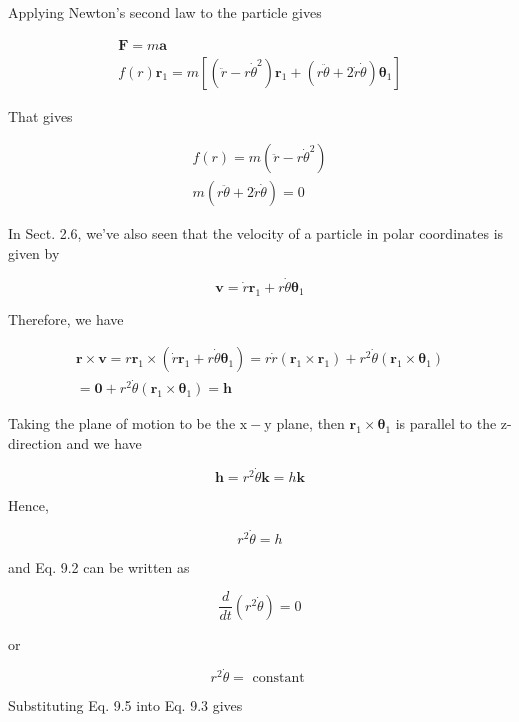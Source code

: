 \documentclass[10pt]{article}
\begin{document}
Applying Newton's second law to the particle gives

$$
\begin{gathered}
\mathbf{F}=m \mathbf{a} \\
f(r) \mathbf{r}_{1}=m\left[\left(\ddot{r}-r \dot{\theta}^{2}\right) \mathbf{r}_{1}+(r \ddot{\theta}+2 \dot{r} \dot{\theta}) \boldsymbol{\theta}_{1}\right]
\end{gathered}
$$

That gives


\begin{gather*}
f(r)=m\left(\ddot{r}-r \dot{\theta}^{2}\right)  \tag{9.3}\\
m(r \ddot{\theta}+2 \dot{r} \dot{\theta})=0 \tag{9.4}
\end{gather*}


In Sect. 2.6, we've also seen that the velocity of a particle in polar coordinates is given by

$$
\mathbf{v}=\dot{r} \mathbf{r}_{1}+r \dot{\theta} \boldsymbol{\theta}_{1}
$$

Therefore, we have

$$
\begin{gathered}
\mathbf{r} \times \mathbf{v}=r \mathbf{r}_{1} \times\left(\dot{r} \mathbf{r}_{1}+r \dot{\theta} \boldsymbol{\theta}_{1}\right)=r \dot{r}\left(\mathbf{r}_{1} \times \mathbf{r}_{1}\right)+r^{2} \dot{\theta}\left(\mathbf{r}_{1} \times \boldsymbol{\theta}_{1}\right) \\
=\mathbf{0}+r^{2} \dot{\theta}\left(\mathbf{r}_{1} \times \boldsymbol{\theta}_{1}\right)=\mathbf{h}
\end{gathered}
$$

Taking the plane of motion to be the $\mathrm{x}-\mathrm{y}$ plane, then $\mathbf{r}_{1} \times \boldsymbol{\theta}_{1}$ is parallel to the z-direction and we have

$$
\mathbf{h}=r^{2} \dot{\theta} \mathbf{k}=h \mathbf{k}
$$

Hence,


\begin{equation*}
r^{2} \dot{\theta}=h \tag{9.5}
\end{equation*}


and Eq. 9.2 can be written as

$$
\frac{d}{d t}\left(r^{2} \dot{\theta}\right)=0
$$

or

$$
r^{2} \dot{\theta}=\text { constant }
$$

Substituting Eq. 9.5 into Eq. 9.3 gives
\end{document}
